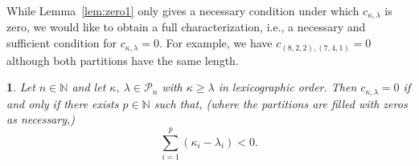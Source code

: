 \documentclass{mathincs}
\numberwithin{equation}{section}
\numberwithin{figure}{section}
\theoremstyle{plain}
\newtheorem{thm}{\protect\theoremname}[section]
\theoremstyle{definition}
\theoremstyle{remark}
\theoremstyle{plain}
\theoremstyle{definition}
\theoremstyle{plain}
\theoremstyle{plain}
\providecommand{\theoremname}{Theorem}
\begin{document}
While Lemma~\ref{lem:zero1} only gives a necessary condition under which
$c_{\kappa,\lambda}$ is zero, we would like to obtain a full characterization,
i.e., a necessary and sufficient condition for $c_{\kappa,\lambda}=0$. For
example, we have $c_{(8,2,2),(7,4,1)} = 0$ although both partitions have the
same length.
\begin{thm}\label{thm:zero2}
  Let $n\in\mathbb{N}$ and let $\kappa,\ \lambda\in\mathcal{P}_n$  with $\kappa\geq\lambda$ in lexicographic order. Then $c_{\kappa,\lambda}=0$
  if and only if there exists $p\in\mathbb{N}$ such that,  (where the partitions are filled with zeros as necessary,)
  \begin{equation}\label{eq:prop}
    \sum_{i=1}^p (\kappa_i - \lambda_i) < 0.
  \end{equation}

\end{thm}
\end{document}
